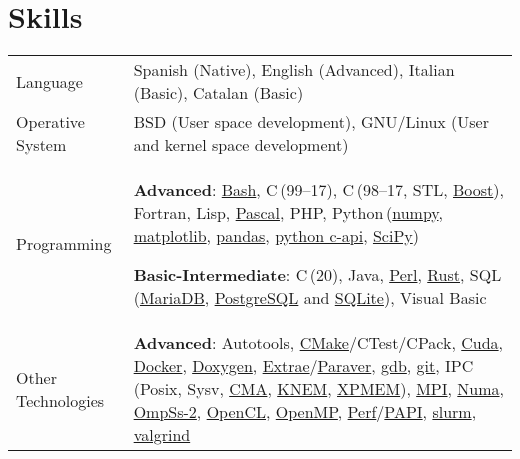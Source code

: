 \documentclass[a4paper,11pt]{article}
\def\CC{{C\nolinebreak[4]\hspace{-.05em}\raisebox{.2ex}{++}}}
\begin{document}
\section{Skills}
\begin{tabularx}{\linewidth}{@{}l X@{}}
  Language & Spanish (Native), English (Advanced), Italian (Basic), Catalan (Basic)\\
  Operative System & BSD (User space development), GNU/Linux (User and kernel space development) \\
  Programming & \textbf{Advanced}: \href{https://www.gnu.org/software/bash/}{Bash},
                C\,(99--17), \CC\,(98--17, STL, \href{https://www.boost.org/}{Boost}), Fortran, Lisp,
                \href{https://www.freepascal.org/}{Pascal}, PHP,
                Python\,(\href{https://numpy.org/}{numpy},
                \href{https://matplotlib.org/}{matplotlib},
                \href{https://pandas.pydata.org/}{pandas},
                \href{https://docs.python.org/3/c-api/index.html}{python c-api},
                \href{https://scipy.org/}{SciPy})

                \textbf{Basic-Intermediate}: \CC\,(20), Java,
                \href{https://www.perl.org/}{Perl},
                \href{https://www.rust-lang.org/}{Rust},
                SQL (\href{https://mariadb.org/}{MariaDB},
                \href{https://www.postgresql.org/}{PostgreSQL} and
                \href{https://www.sqlite.org/index.html}{SQLite}), Visual Basic  \\

  Other Technologies & \textbf{Advanced}:
                       Autotools,
                       \href{https://cmake.org/}{CMake}/CTest/CPack,
                       \href{https://developer.nvidia.com/cuda-zone}{Cuda},
                       \href{https://www.docker.com/}{Docker},
                       \href{https://doxygen.nl/}{Doxygen},
                       \href{https://tools.bsc.es/extrae}{Extrae}/\href{https://tools.bsc.es/paraver}{Paraver},
                       \href{https://www.sourceware.org/gdb/}{gdb},
                       \href{https://git-scm.com/}{git},
                       IPC\,(Posix, Sysv,
                       \href{https://lwn.net/Articles/405284/}{CMA},
                       \href{https://knem.gitlabpages.inria.fr/}{KNEM},
                       \href{https://github.com/hpc/xpmem}{XPMEM}),
                       \href{https://www.mpi-forum.org/}{MPI},
                       \href{https://www.kernel.org/doc/html/v4.19/vm/numa.html}{Numa},
                       \href{https://pm.bsc.es/ompss-2}{OmpSs-2},
                       \href{https://www.khronos.org/api/opencl}{OpenCL},
                       \href{https://www.openmp.org/}{OpenMP},
                       \href{https://perf.wiki.kernel.org/index.php/Main_Page}{Perf}/\href{https://icl.utk.edu/papi/}{PAPI},
                       \href{https://slurm.schedmd.com/}{slurm},
                       \href{https://valgrind.org/}{valgrind}


\end{tabularx}
\end{document}
